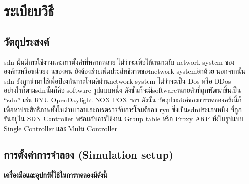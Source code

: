 \section{ระเบียบวิธี} 

\subsection{วัตถุประสงค์}  
\indent\indent
\gls{sdn} นั้นมีการใช้งานและการตั้งค่าที่หลากหลาย
ไม่ว่าจะเพื่อให้เหมาะกับ \gls{network-system} ขององค์กรหรือหน่วยงานของตน ยังต้องช่วยเพิ่มประสิทธิภาพของ\gls{network-system}อีกด้วย
นอกจากนั้น \gls{sdn} ยังถูกนำมาใช้เพื่อป้องกันการโจมตีผ่าน\gls{network-system} ไม่ว่าจะเป็น Dos หรือ DDos
อย่างไรก็ตาม\gls{sdn}นั้นก็คือ \gls{software} รูปแบบหนึ่ง
ดังนั้นก็จะมี\gls{software}หลายตัวที่ถูกพัฒนาขึ้นเป็น ``\gls{sdn}'' เช่น RYU OpenDaylight NOX POX ฯลฯ 
ดังนั้น
วัตถุประสงค์ของการทดลองครั้งนี้ก็เพื่อหาประสิทธิภาพทั้งในด้านเวลาและการตรวจจับการโจมตีของ \gls{ryu} ซึ่งเป็น\gls{sdn}ประเภทหนึ่ง ที่ถูกรันอยู่ใน SDN Controller
พร้อมกับการใช้งาน Group table หรือ Proxy ARP ทั้งในรูปแบบ Single Controller และ Multi Controller 
\\
\subsection{การตั้งค่าการจำลอง (Simulation setup)}

\textbf{เครื่องมือและอุปกร์ที่ใช้ในการทดลองมีดังนี้} 

